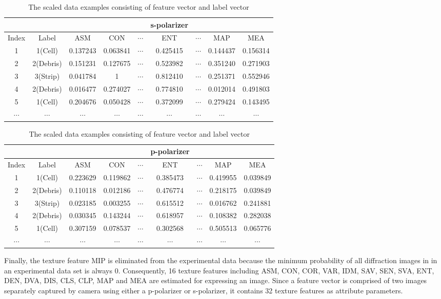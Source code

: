 \begin{table}[!h]
\renewcommand{\arraystretch}{0.5}
\begin{tabular}{||c c | c c c c c c c||}
\hline
& & & & & s-polarizer & & &\\
\hline
Index & Label & ASM & CON & $\cdots$ & ENT & $\cdots$ & MAP & MEA\\[0.7ex]
\hline\hline
1 & 1(Cell) & 0.137243 & 0.063841 & $\cdots$ & 0.425415 & $\cdots$ & 0.144437 & 0.156314 \\
2 & 2(Debris) & 0.151231 & 0.127675 & $\cdots$ & 0.523982 & $\cdots$ & 0.351240 & 0.271903 \\
3 & 3(Strip) & 0.041784 & 1 & $\cdots$ & 0.812410 & $\cdots$ & 0.251371 & 0.552946 \\
4 & 2(Debris) & 0.016477 & 0.274027 & $\cdots$ & 0.774810 & $\cdots$ & 0.012014 & 0.491803 \\
5 & 1(Cell) & 0.204676 & 0.050428 & $\cdots$ & 0.372099 & $\cdots$ & 0.279424 & 0.143495 \\
$\cdots$ & $\cdots$ & $\cdots$ & $\cdots$ & $\cdots$ & $\cdots$ & $\cdots$ & $\cdots$ & $\cdots$\\
\hline
\end{tabular}
\begin{tabular}{||c c | c c c c c c c||}
\hline
& & & & & p-polarizer & & &\\
\hline
Index & Label & ASM & CON & $\cdots$ & ENT & $\cdots$ & MAP & MEA\\[0.7ex]
\hline\hline
1 & 1(Cell) & 0.223629 & 0.119862 & $\cdots$ & 0.385473 & $\cdots$ & 0.419955 & 0.039849 \\
2 & 2(Debris) & 0.110118 & 0.012186 & $\cdots$ & 0.476774 & $\cdots$ & 0.218175 & 0.039849 \\
3 & 3(Strip) & 0.023185 & 0.003255 & $\cdots$ & 0.615512 & $\cdots$ & 0.016762 & 0.241881 \\
4 & 2(Debris) & 0.030345 & 0.143244 & $\cdots$ & 0.618957 & $\cdots$ & 0.108382 & 0.282038 \\
5 & 1(Cell) & 0.307159 & 0.078537 & $\cdots$ & 0.302568 & $\cdots$ & 0.505513 & 0.065776 \\
$\cdots$ & $\cdots$ & $\cdots$ & $\cdots$ & $\cdots$ & $\cdots$ & $\cdots$ & $\cdots$ & $\cdots$\\
\hline
\end{tabular}
\caption {The scaled data examples consisting of feature vector and label vector}
\end{table}
Finally, the texture feature MIP is eliminated from the experimental data because the minimum probability of all diffraction images in in an experimental data set is always 0. Consequently, 16 texture features including ASM, CON, COR, VAR, IDM, SAV, SEN, SVA, ENT, DEN, DVA, DIS, CLS, CLP, MAP and MEA are estimated for expressing an image. Since a feature vector is comprised of two images separately captured by camera using either a p-polarizer or s-polarizer, it contains 32 texture features as attribute parameters.    
